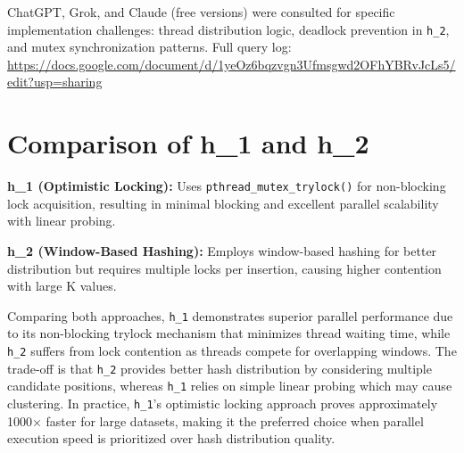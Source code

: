 \documentclass[a4paper,12pt]{article}
\begin{document}
ChatGPT, Grok, and Claude (free versions) were consulted for specific implementation challenges: thread distribution logic, deadlock prevention in \texttt{h\_2}, and mutex synchronization patterns. Full query log: \url{https://docs.google.com/document/d/1yeOz6bqzvgn3Ufmsgwd2OFhYBRvJcLs5/edit?usp=sharing}

\section{Comparison of h\_1 and h\_2}

\textbf{\textcolor{primarycolor}{h\_1 (Optimistic Locking):}} Uses \texttt{pthread\_mutex\_trylock()} for non-blocking lock acquisition, resulting in minimal blocking and excellent parallel scalability with linear probing.

\textbf{\textcolor{primarycolor}{h\_2 (Window-Based Hashing):}} Employs window-based hashing for better distribution but requires multiple locks per insertion, causing higher contention with large K values.

Comparing both approaches, \texttt{h\_1} demonstrates superior parallel performance due to its non-blocking trylock mechanism that minimizes thread waiting time, while \texttt{h\_2} suffers from lock contention as threads compete for overlapping windows. The trade-off is that \texttt{h\_2} provides better hash distribution by considering multiple candidate positions, whereas \texttt{h\_1} relies on simple linear probing which may cause clustering. In practice, \texttt{h\_1}'s optimistic locking approach proves approximately 1000× faster for large datasets, making it the preferred choice when parallel execution speed is prioritized over hash distribution quality.
\end{document}
